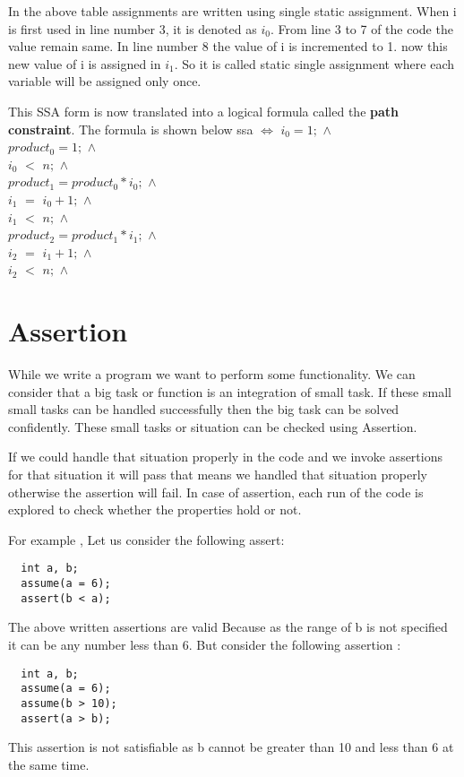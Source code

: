 In the above table assignments are written using single static assignment. When
i is first used in line number 3, it is denoted as $ i_0 $. From line 3 to 7 of
the code the value remain same. In line number 8 the value of i is incremented 
to 1. now this new value of i is assigned in $ i_1 $. So it is called static 
single assignment where each variable will be assigned only once.

This SSA form is now translated into a logical formula called the \textbf{path constraint}.
The formula is shown below
ssa $\Longleftrightarrow$ $ i_0 = 1; $                        $\wedge $ \\
                          $ product_0 = 1; $                  $\wedge $ \\
                          $ i_0 $ $<$ $ n ;$                  $\wedge $ \\
                          $product_1 = product_0 * i_0; $     $\wedge $ \\
                          $ i_1 $ $=$ $ i_0 + 1; $            $\wedge $ \\
                          $ i_1 $ $<$ $ n ;$                  $\wedge $ \\
                          $product_2 = product_1 * i_1; $     $\wedge $  \\
                          $ i_2 $ $=$ $ i_1 + 1; $            $\wedge $ \\ 
                          $ i_2 $ $<$ $ n ;$                  $\wedge $ \\
                          
\section {Assertion }

While we write a program we want to perform some functionality. We can consider
that a big task or function is an integration of small task. If these small 
small tasks can be handled successfully then the big task can be solved 
confidently. These small tasks or situation can be checked using Assertion.

If we could handle that situation properly in the code and we invoke assertions
for that situation it will pass that means we handled that situation properly 
otherwise the assertion will fail. In case of assertion, each run of the code is 
explored to check whether the properties hold or not.

For example , Let us consider the following assert:
 \begin{verbatim}
  int a, b;
  assume(a = 6);
  assert(b < a);
 \end{verbatim}

 The above written assertions are valid Because as the range of b is not specified
 it can be any number less than 6. But consider the following assertion :
 
 \begin{verbatim}
  int a, b;
  assume(a = 6);
  assume(b > 10);
  assert(a > b);
 \end{verbatim}

 This assertion is not satisfiable as b cannot be greater than 10 and less than 6
 at the same time. 
 

